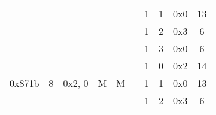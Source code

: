 \documentclass[11pt]{homework}
\newcommand{\cmark}{\ding{51}}%
\begin{document}
\begin{arabicparts}
{\begin{tabular}{|c|c|c|c|c|c|c|c|c|c|}
            \cline{7-10}
                                     &                                                                        &                             &                                                                   &                                                                    &                                                                      & 1                        & 1     & 0x0 & 13            \\
            \cline{7-10}
                                     &                                                                        &                             &                                                                   &                                                                    &                                                                      & 1                        & 2     & 0x3 & 6             \\
            \cline{7-10}
                                     &                                                                        &                             &                                                                   &                                                                    &                                                                      & 1                        & 3     & 0x0 & 6             \\
            \hline
            \multirow{4}{*}{0x871b}  & \multirow{4}{*}{8}                                                     & \multirow{4}{*}{0x2, 0}     & \multirow{4}{*}{M}                                                & \multirow{4}{*}{M}                                                 & \multirow{4}{*}{\cmark}                                              & 1                        & 0     & 0x2 & 14            \\
            \cline{7-10}
                                     &                                                                        &                             &                                                                   &                                                                    &                                                                      & 1                        & 1     & 0x0 & 13            \\
            \cline{7-10}
                                     &                                                                        &                             &                                                                   &                                                                    &                                                                      & 1                        & 2     & 0x3 & 6             \\

\end{tabular}}
\end{arabicparts}
\end{document}
